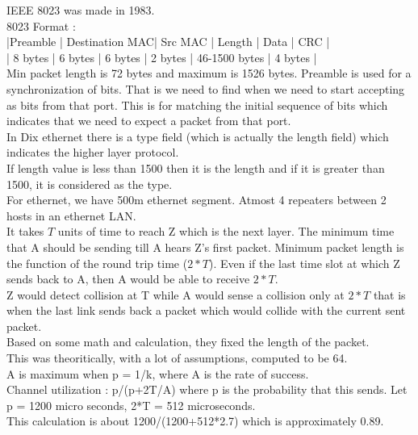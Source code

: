 \documentclass[solution,addpoints,12pt]{exam}
\begin{document}
IEEE 8023 was made in 1983.\\
8023 Format :\\
|Preamble | Destination MAC| Src MAC | Length  | Data          | CRC     |\\
| 8 bytes |    6 bytes     | 6 bytes | 2 bytes | 46-1500 bytes | 4 bytes |\\
Min packet length is 72 bytes and maximum is 1526 bytes.
Preamble is used for a synchronization of bits. That is we need to find
when we need to start accepting as bits from that port. This is for
matching the initial sequence of bits which indicates that
we need to expect a packet from that port.\\

In Dix ethernet there is a type field (which is actually the length field)
which indicates the higher layer protocol.\\
If length value is less than 1500 then it is the length and if it is greater
than 1500, it is considered as the type.\\

For ethernet, we have 500m ethernet segment. Atmost
4 repeaters between 2 hosts in an ethernet LAN.\\
It takes $T$ units of time to reach Z which is the next layer.
The minimum time that A should be sending till A hears Z's
first packet. Minimum packet length is the function
of the round trip time ($2*T$). Even if the last time slot
at which Z sends back to A, then A would be able to receive $2*T$.\\
Z would detect collision at T while A would sense a collision only
at $2*T$ that is when the last link sends back a packet which
would collide with the current sent packet.\\

Based on some math and calculation, they fixed the
length of the packet.\\
This was theoritically, with a lot of assumptions, computed to be
64.\\
A is maximum when p = 1/k, where A is the rate of success.\\
Channel utilization : p/(p+2T/A) where p is the probability that
this sends. Let p = 1200 micro seconds, 2*T = 512 microseconds.\\
This calculation is about 1200/(1200+512*2.7)
which is approximately 0.89.\\
\end{document}
